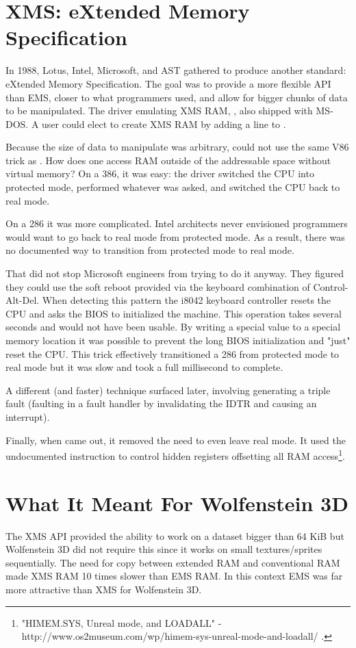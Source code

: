 \section{XMS: eXtended Memory Specification}
In 1988, Lotus, Intel, Microsoft, and AST gathered to produce another standard: eXtended Memory Specification. The goal was to provide a more flexible API than EMS, closer to what programmers used, and allow for bigger chunks of data to be manipulated. The driver emulating XMS RAM, , also shipped with MS-DOS. A user could elect to create XMS RAM by adding a line to .\\
\par
Because the size of data to manipulate was arbitrary,  could not use the same V86 trick as . How does one access RAM outside of the addressable space without virtual memory? On a 386, it was easy: the driver switched the CPU into protected mode, performed whatever was asked, and switched the CPU back to real mode.\\
\par
 On a 286 it was more complicated. Intel architects never envisioned programmers would want to go back to real mode from protected mode. As a result, there was no documented way to transition from protected mode to real mode.\\
 \par
  That did not stop Microsoft engineers from trying to do it anyway. They figured they could use the soft reboot provided via the keyboard combination of Control-Alt-Del. When detecting this pattern the i8042 keyboard controller resets the CPU and asks the BIOS to initialized the machine. This operation takes several seconds and would not have been usable. By writing a special value to a special memory location it was possible to prevent the long BIOS initialization and "just" reset the CPU. This trick effectively transitioned a 286 from protected mode to real mode but it was slow and took a full millisecond to complete.\\
 \par
  A different (and faster) technique surfaced later, involving generating a triple fault (faulting in a fault handler by invalidating the IDTR and causing an interrupt).\\
  \par
   Finally, when  came out, it removed the need to even leave real mode. It used the undocumented  instruction to control hidden registers offsetting all RAM access\footnote{"HIMEM.SYS, Unreal mode, and LOADALL" - http://www.os2museum.com/wp/himem-sys-unreal-mode-and-loadall/ .}.\\
\par
\section{What It Meant For Wolfenstein 3D}
The XMS API provided the ability to work on a dataset bigger than 64 KiB but Wolfenstein 3D did not require this since it works on small textures/sprites sequentially. The need for copy between extended RAM and conventional RAM made XMS RAM 10 times slower than EMS RAM. In this context EMS was far more attractive than XMS for Wolfenstein 3D.